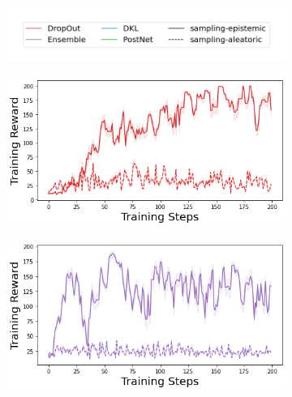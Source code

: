 \begin{figure}
    \centering
    \begin{subfigure}{.45\textwidth}
        \includegraphics[width=\textwidth]{sections/011_icml2022/resources/sampling-legend.png}
    \end{subfigure}
    \vspace{-3mm}
    
    \begin{subfigure}{.245\textwidth}
        \includegraphics[width=\textwidth]{sections/011_icml2022/resources/cartpole-training_total_reward-dropout-training-strategy.png}
    \end{subfigure}
    \begin{subfigure}{.245\textwidth}
        \includegraphics[width=\textwidth]{sections/011_icml2022/resources/cartpole-training_total_reward-ensemble-training-strategy.png}
    \end{subfigure}

\end{figure}
